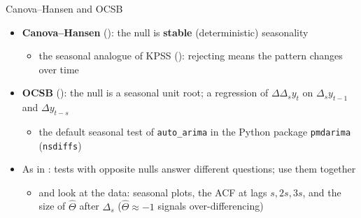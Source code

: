 \begin{frame}{Canova--Hansen and OCSB}
\itemsize{\small}
\begin{itemize}
    \item \textbf{Canova--Hansen} (): the null is \textbf{stable} (deterministic) seasonality
    \begin{itemize}
        \item the seasonal analogue of KPSS (): rejecting means the pattern changes over time
    \end{itemize}
    \item \textbf{OCSB} (): the null is a seasonal unit root; a regression of $\Delta\Delta_s y_t$ on $\Delta_s y_{t-1}$ and $\Delta y_{t-s}$
    \begin{itemize}
        \item the default seasonal test of \texttt{auto\_arima} in the Python package \texttt{pmdarima} (\texttt{nsdiffs})
    \end{itemize}
    \item As in : tests with opposite nulls answer different questions; use them together
    \begin{itemize}
        \item and look at the data: seasonal plots, the ACF at lags $s, 2s, 3s$, and the size of $\hat\Theta$ after $\Delta_s$ ($\hat\Theta \approx -1$ signals over-differencing)
    \end{itemize}
\end{itemize}
\end{frame}


